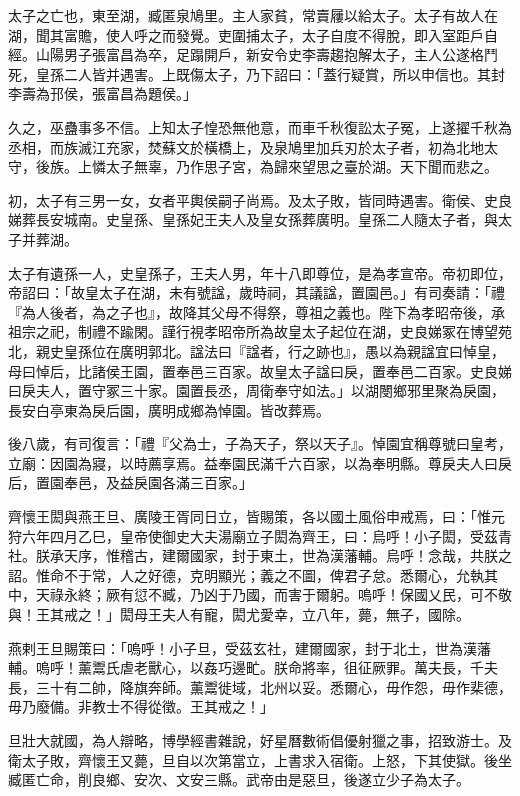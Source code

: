 \begin{pinyinscope}
太子之亡也，東至湖，臧匿泉鳩里。主人家貧，常賣屨以給太子。太子有故人在湖，聞其富贍，使人呼之而發覺。吏圍捕太子，太子自度不得脫，即入室距戶自經。山陽男子張富昌為卒，足蹋開戶，新安令史李壽趨抱解太子，主人公遂格鬥死，皇孫二人皆并遇害。上既傷太子，乃下詔曰：「蓋行疑賞，所以申信也。其封李壽為邘侯，張富昌為題侯。」

久之，巫蠱事多不信。上知太子惶恐無他意，而車千秋復訟太子冤，上遂擢千秋為丞相，而族滅江充家，焚蘇文於橫橋上，及泉鳩里加兵刃於太子者，初為北地太守，後族。上憐太子無辜，乃作思子宮，為歸來望思之臺於湖。天下聞而悲之。

初，太子有三男一女，女者平輿侯嗣子尚焉。及太子敗，皆同時遇害。衛侯、史良娣葬長安城南。史皇孫、皇孫妃王夫人及皇女孫葬廣明。皇孫二人隨太子者，與太子并葬湖。

太子有遺孫一人，史皇孫子，王夫人男，年十八即尊位，是為孝宣帝。帝初即位，帝詔曰：「故皇太子在湖，未有號諡，歲時祠，其議諡，置園邑。」有司奏請：「禮『為人後者，為之子也』，故降其父母不得祭，尊祖之義也。陛下為孝昭帝後，承祖宗之祀，制禮不踰閑。謹行視孝昭帝所為故皇太子起位在湖，史良娣冢在博望苑北，親史皇孫位在廣明郭北。諡法曰『諡者，行之跡也』，愚以為親諡宜曰悼皇，母曰悼后，比諸侯王園，置奉邑三百家。故皇太子諡曰戾，置奉邑二百家。史良娣曰戾夫人，置守冢三十家。園置長丞，周衛奉守如法。」以湖閿鄉邪里聚為戾園，長安白亭東為戾后園，廣明成鄉為悼園。皆改葬焉。

後八歲，有司復言：「禮『父為士，子為天子，祭以天子』。悼園宜稱尊號曰皇考，立廟：因園為寢，以時薦享焉。益奉園民滿千六百家，以為奉明縣。尊戾夫人曰戾后，置園奉邑，及益戾園各滿三百家。」

齊懷王閎與燕王旦、廣陵王胥同日立，皆賜策，各以國土風俗申戒焉，曰：「惟元狩六年四月乙巳，皇帝使御史大夫湯廟立子閎為齊王，曰：烏呼！小子閎，受茲青社。朕承天序，惟稽古，建爾國家，封于東土，世為漢藩輔。烏呼！念哉，共朕之詔。惟命不于常，人之好德，克明顯光；義之不圖，俾君子怠。悉爾心，允執其中，天祿永終；厥有愆不臧，乃凶于乃國，而害于爾躬。嗚呼！保國乂民，可不敬與！王其戒之！」閎母王夫人有寵，閎尤愛幸，立八年，薨，無子，國除。

燕剌王旦賜策曰：「嗚呼！小子旦，受茲玄社，建爾國家，封于北土，世為漢藩輔。嗚呼！薰鬻氏虐老獸心，以姦巧邊甿。朕命將率，徂征厥罪。萬夫長，千夫長，三十有二帥，降旗奔師。薰鬻徙域，北州以妥。悉爾心，毋作怨，毋作棐德，毋乃廢備。非教士不得從徵。王其戒之！」

旦壯大就國，為人辯略，博學經書雜說，好星曆數術倡優射獵之事，招致游士。及衛太子敗，齊懷王又薨，旦自以次第當立，上書求入宿衛。上怒，下其使獄。後坐臧匿亡命，削良鄉、安次、文安三縣。武帝由是惡旦，後遂立少子為太子。


\end{pinyinscope}
